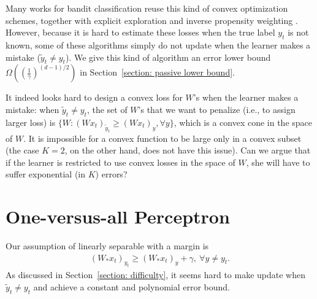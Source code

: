 \documentclass{article}
\begin{document}
Many works for bandit classification reuse this kind of convex optimization schemes, together with explicit exploration and inverse propensity weighting \cite{kakade2008efficient, hazan2011newtron, beygelzimer2017efficient, foster2018logistic}. However, because it is hard to estimate these losses when the true label $y_t$ is not known, some of these algorithms \cite{beygelzimer2017efficient, foster2018logistic} simply do not update when the learner makes a mistake ($\tilde{y}_t \neq y_t$). We give this kind of algorithm an error lower bound $\Omega\left(\left(\frac{1}{\gamma}\right)^{(d-1)/2}\right)$ in Section~\ref{section: passive lower bound}. 

It indeed looks hard to design a convex loss for $W$'s when the learner makes a mistake: when $\tilde{y}_t
\neq y_t$, the set of $W$'s that we want to penalize (i.e., to assign larger loss) is $\{W: (Wx_t)_{\tilde{y}_t} \geq (Wx_t)_{y}, \forall y \}$, which is a convex cone in the space of $W$. It is impossible for a convex function to be large only in a convex subset (the case $K=2$, on the other hand, does not have this issue). Can we argue that if the learner is restricted to use convex losses in the space of $W$, she will have to suffer exponential (in $K$) errors? 

\section{One-versus-all Perceptron}
\label{sec:ova}
Our assumption of linearly separable with a margin is 
\begin{align}
 (W_*x_t)_{y_t} \geq (W_*x_t)_{y} + \gamma, \ \forall y\neq y_t. \label{eqn:weaker}
\end{align}
As discussed in Section~\ref{section: difficulty}, it seems hard to make update when $\tilde{y}_t\neq y_t$ and achieve a constant and polynomial error bound. 
\end{document}
